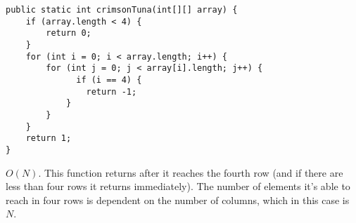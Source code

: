 \begin{blocksection}
\question
\begin{lstlisting}
public static int crimsonTuna(int[][] array) {
    if (array.length < 4) {
        return 0;
    }
    for (int i = 0; i < array.length; i++) {
        for (int j = 0; j < array[i].length; j++) {
              if (i == 4) {
                return -1;
            }
        }
    }
    return 1;
}
\end{lstlisting}

\begin{solution}
$O(N)$. This function returns after it reaches the fourth row (and if there are less than four rows it returns immediately). The number of elements it's able to reach in four rows is dependent on the number of columns, which in this case is $N$. 
\end{solution}
\end{blocksection}
